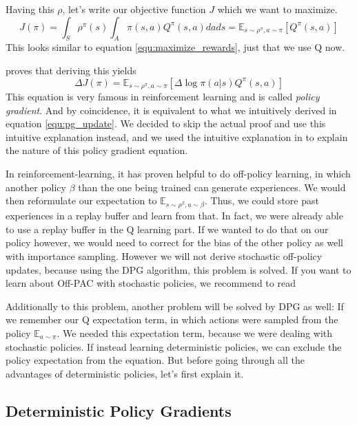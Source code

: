 \documentclass[hyperref,final,beleg]{cgvpub}
\begin{document}
Having this $\rho$, let's write our objective function $J$ which we want to maximize.
\begin{equation}
J(\pi) = \int_S \rho^{\pi}(s) \int_A \pi(s, a)Q^{\pi}(s, a) dads = \mathbb{E}_{s \sim \rho^{\pi}, a \sim \pi}[Q^{\pi}(s,a)]
\end{equation}
This looks similar to equation \ref{equ:maximize_rewards}, just that we use Q now.


\cite{suttonPolicyGradientMethods} proves that deriving this yields
\begin{equation}
\Delta J(\pi) = \mathbb{E}_{s \sim \rho^{\pi}, a \sim \pi}[\Delta \log \pi(a|s)Q^{\pi}(s, a)]
\label{equ:pg}
\end{equation}
This equation is very famous in reinforcement learning and is called \textit{policy gradient}. And by coincidence, it is equivalent to what we intuitively derived in equation \ref{equ:pg_update}. We decided to skip the actual proof and use this intuitive explanation instead, and we used the intuitive explanation in \cite[Chapter 13, Section 3, after Equation 13.8]{suttonReinforcementLearningIntroduction2018} to explain the nature of this policy gradient equation.


In reinforcement-learning, it has proven helpful to do off-policy learning, in which another policy $\beta$ than the one being trained can generate experiences. We would then reformulate our expectation to $\mathbb{E}_{s \sim \rho^{\beta}, a \sim \beta}$. Thus, we could store past experiences in a replay buffer and learn from that. In fact, we were already able to use a replay buffer in the Q learning part. If we wanted to do that on our policy however, we would need to correct for the bias of the other policy as well with importance sampling. However we will not derive stochastic off-policy updates, because using the \ac{DPG} algorithm, this problem is solved. If you want to learn about \ac{Off-PAC} with stochastic policies, we recommend to read \cite{degrisOffPolicyActorCritic2013}

Additionally to this problem, another problem will be solved by \ac{DPG} as well: If we remember our Q expectation term, in which actions were sampled from the policy $\mathbb{E}_{a \sim \pi}$. We needed this expectation term, because we were dealing with stochastic policies. If instead learning deterministic policies, we can exclude the policy expectation from the equation. But before going through all the advantages of deterministic policies, let's first explain it.

\subsection{Deterministic Policy Gradients}
\label{sec:dpg}
\end{document}
